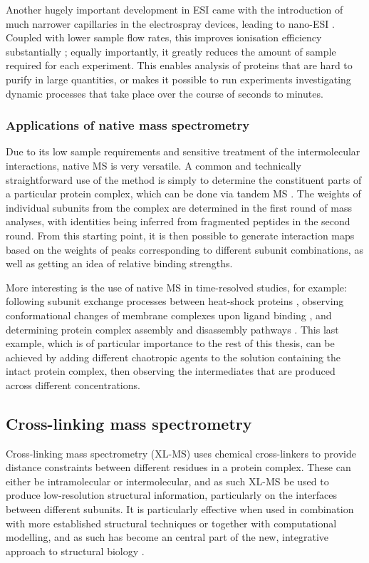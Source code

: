 \documentclass[a4paper,11pt,twoside,openright]{scrbook}
\begin{document}
Another hugely important development in ESI came with the introduction of much
narrower capillaries in the electrospray devices, leading to nano-ESI
\cite{Wilm1994}. Coupled with lower sample flow rates, this improves ionisation
efficiency substantially \cite{El-Faramawy2005}; equally importantly, it greatly
reduces the amount of sample required for each experiment. This enables analysis
of proteins that are hard to purify in large quantities, or makes it possible to
run experiments investigating dynamic processes that take place over the course
of seconds to minutes.

\subsubsection{Applications of native mass spectrometry}
Due to its low sample requirements and sensitive treatment of the intermolecular
interactions, native MS is very versatile. A common and technically
straightforward use of the method is simply to determine the constituent parts
of a particular protein complex, which can be done via tandem MS
\cite{Sobott2002,Hernandez2007}. The weights of individual subunits from the
complex are determined in the first round of mass analyses, with identities
being inferred from fragmented peptides in the second round. From this starting
point, it is then possible to generate interaction maps based on the weights of
peaks corresponding to different subunit combinations, as well as getting an
idea of relative binding strengths.

More interesting is the use of native MS in time-resolved studies, for example:
following subunit exchange processes between heat-shock proteins
\cite{Sobott2002a}, observing conformational changes of membrane complexes upon
ligand binding \cite{Laganowsky2014}, and determining protein complex assembly
and disassembly pathways \cite{Levy2008}. This last example, which is of
particular importance to the rest of this thesis, can be achieved by adding
different chaotropic agents to the solution containing the intact protein
complex, then observing the intermediates that are produced across different
concentrations.

\subsection{Cross-linking mass spectrometry}
Cross-linking mass spectrometry (XL-MS) uses chemical cross-linkers to provide
distance constraints between different residues in a protein complex. These can
either be intramolecular or intermolecular, and as such XL-MS be used to produce
low-resolution structural information, particularly on the interfaces between
different subunits. It is particularly effective when used in combination with
more established structural techniques or together with computational modelling,
and as such has become an central part of the new, integrative approach to
structural biology \cite{Stengel2012,Ward2013,VandenBedem2015}.
\end{document}
